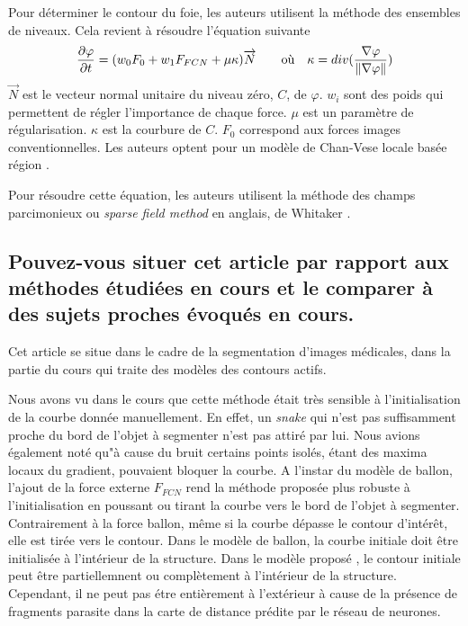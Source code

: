 \documentclass[a4paper, 11pt]{article}
\begin{document}
Pour déterminer le contour du foie, les auteurs utilisent la méthode des ensembles de niveaux. Cela revient à résoudre l'équation suivante
$$
\frac{\partial \varphi}{\partial t} = (w_0F_0 + w_1F_{FCN} + \mu\kappa)\overrightarrow{N} \qquad \textrm{où} \quad \kappa = div(\frac{\nabla \varphi}{\left\lVert\nabla\varphi\right\rVert})
$$
$\overrightarrow{N}$ est le vecteur normal unitaire du niveau zéro, $C$, de $\varphi$. $w_i$ sont des poids qui permettent de régler l'importance de chaque force. $\mu$ est un paramètre de régularisation. $\kappa$ est la courbure de $C$.
$F_0$ correspond aux forces images conventionnelles. Les auteurs optent pour un modèle de Chan-Vese locale basée région \cite{lankton_localizing_2008}. 

Pour résoudre cette équation, les auteurs utilisent la méthode des champs parcimonieux ou \textit{sparse field method} en anglais, de Whitaker \cite{whitaker_level-set_1998}. 

\subsection{Pouvez-vous situer cet article par rapport aux méthodes étudiées en cours et le comparer à des sujets proches évoqués en cours.}

Cet article se situe dans le cadre de la segmentation d'images médicales, dans la partie du cours qui traite des modèles des contours actifs. 

Nous avons vu dans le cours que cette méthode était très sensible à l'initialisation de la courbe donnée manuellement. En effet, un \textit{snake} qui n'est pas suffisamment proche du bord de l'objet à segmenter n'est pas attiré par lui. Nous avions également noté qu"à cause du bruit certains points isolés, étant des maxima locaux du gradient, pouvaient bloquer la courbe. A l'instar du modèle de ballon, l'ajout de la force externe $F_{FCN}$ rend la méthode proposée plus robuste à l'initialisation en poussant ou tirant la courbe vers le bord de l'objet à segmenter. Contrairement à la force ballon, même si la courbe dépasse le contour d'intérêt, elle est tirée vers le contour. Dans le modèle de ballon, la courbe initiale doit être initialisée à l'intérieur de la structure. Dans le modèle proposé \cite{guo_automatic_2019}, le contour initiale peut être partiellemnent ou complètement à l'intérieur de la structure. Cependant, il ne peut pas étre entièrement à l'extérieur à cause de la présence de fragments parasite dans la carte de distance prédite par le réseau de neurones. 
\end{document}
